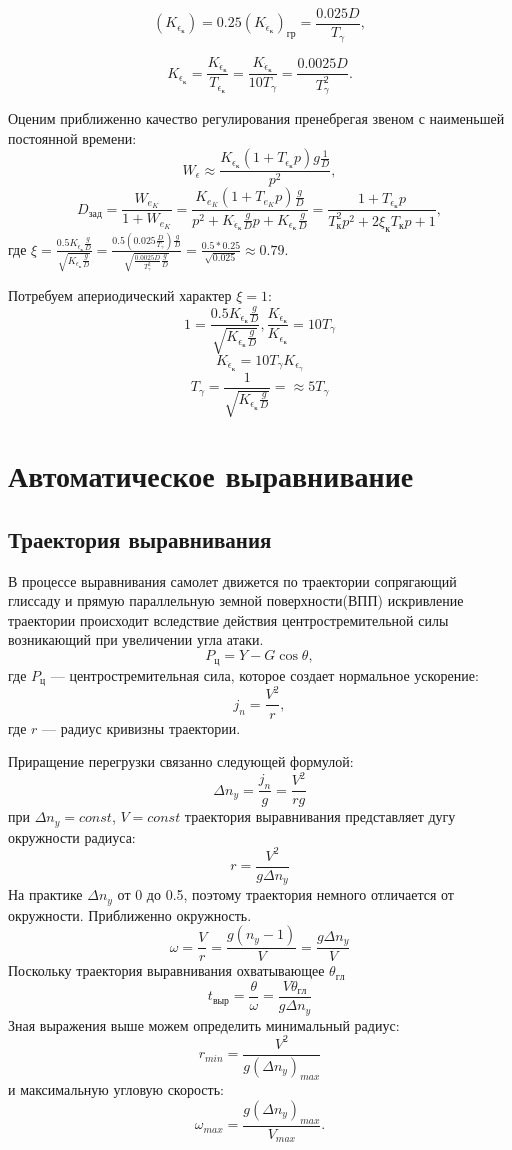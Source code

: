\documentclass{article}
\begin{document}
\[
    (K_{\epsilon_\text{к}}) = 0.25 (K_{\dot{\epsilon}_{\text{к}}})_{\text{гр}}
    = \frac{0.025 D}{T_{\gamma}},
\]

\[
    K_{\epsilon_\text{к}} =
    \frac{K_{\dot{\epsilon}_{\text{к}}}}{T_{\epsilon_\text{к}}} =
    \frac{K_{\dot{\epsilon}_{\text{к}}}}{10 T_\gamma} = \frac{0.0025
    D}{T_\gamma^2}.
\]

Оценим приближенно качество регулирования пренебрегая звеном с наименьшей
постоянной времени:
\[
    W_{\epsilon} \approx \frac{K_{\epsilon_\text{к}}(1 + T_{\epsilon_\text{к}}
    p)g \frac{1}{D}}{p^2},
\]
\[
    D_\text{зад} = \frac{W_{e_K}}{1 + W_{e_K}} = \frac{K_{e_K} (1 + T_{e_K} p)
    \frac{g}{D}}{ p^2 + K_{\dot{\epsilon}_{\text{к}}} \frac{g}{D}p +
K_{\epsilon_\text{к}} \frac{g}{D}} = \frac{1 + T_{\epsilon_\text{к}}p
}{T_\text{к}^2 p^2 + 2 \xi_\text{к} T_\text{к} p + 1},
\]
где $\xi = \frac{0.5 K_{\dot{\epsilon}_{\text{к}}}
\frac{g}{D}}{\sqrt{K_{\epsilon_\text{к}} \frac{g}{D}}} =\frac{0.5(0.025
\frac{D}{T_\gamma}) \frac{g}{D}}{\sqrt{\frac{0.0025 D}{T^2_\gamma}
\frac{g}{D}}} = \frac{0.5 * 0.25}{\sqrt{0.025}} \approx 0.79$.

Потребуем апериодический характер $\xi = 1$:
\[
    1 = \frac{0.5 K_{\dot{\epsilon}_{\text{к}}}
    \frac{g}{D}}{\sqrt{K_{{\epsilon}_{\text{к}}} \frac{g}{D}}},
    \frac{K_{\dot{\epsilon}_{\text{к}}}}{K_{{\epsilon}_{\text{к}}}} = 10
    T_\gamma
\]
\[
    K_{\dot{\epsilon}_{\text{к}}} = 10 T_{\gamma}  K_{\epsilon_\gamma}
\]
\[
    T_\gamma  = \frac{1}{\sqrt{K_{\epsilon_\text{к}}\frac{g}{D}}} = \approx 5
    T_\gamma
\]

\section{Автоматическое выравнивание}
\subsection{Траектория выравнивания }

В процессе выравнивания самолет движется по траектории сопрягающий глиссаду и
прямую параллельную земной поверхности(ВПП) искривление траектории происходит
вследствие действия центростремительной силы возникающий при увеличении угла
атаки. 
\[
    P_{ц} = Y - G \cos{\theta}, 
\]
где $P_{ц}$ --- центростремительная сила, которое создает нормальное ускорение:
\[
    j_n = \frac{V^2}{r}, 
\]
где $r$ --- радиус кривизны траектории.

Приращение перегрузки связанно следующей формулой:
\[
    \Delta n_y = \frac{j_n}{g}= \frac{V^2}{rg}
\]
при $\Delta n_y = const$, $V = const$ траектория выравнивания представляет дугу
окружности радиуса:
\[
    r = \frac{V^2}{g \Delta n_y}
\]
На практике $\Delta n_y$ от 0 до 0.5, поэтому траектория немного отличается от
окружности. Приближенно окружность.
\[
    \omega = \frac{V}{r} = \frac{g(n_y - 1)}{V} = \frac{g \Delta n_y}{V}
\]
Поскольку траектория выравнивания охватывающее $\theta_{гл}$
\[
    t_{выр} = \frac{\theta}{\omega} = \frac{V \theta_{гл}}{g \Delta n_y}
\]
Зная выражения выше можем определить минимальный радиус:
\[
    r_{min} = \frac{V^2}{g(\Delta n_y)_{max}} 
\]
и максимальную угловую скорость:
\[
    \omega_{max} = \frac{g(\Delta n_y)_{max}}{V_{max}}.
\]
\end{document}
